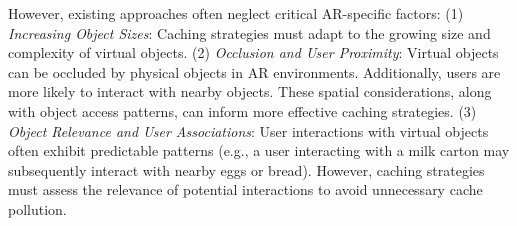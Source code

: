     However, existing approaches often neglect critical AR-specific factors: (1) \textit{Increasing Object Sizes}: Caching strategies must adapt to the growing size and complexity of virtual objects. (2) \textit{Occlusion and User Proximity}: Virtual objects can be occluded by physical objects in AR environments. Additionally, users are more likely to interact with nearby objects. These spatial considerations, along with object access patterns, can inform more effective caching strategies. (3) \textit{Object Relevance and User Associations}: User interactions with virtual objects often exhibit predictable patterns (e.g., a user interacting with a milk carton may subsequently interact with nearby eggs or bread). However, caching strategies must assess the relevance of potential interactions to avoid unnecessary cache pollution.

    
